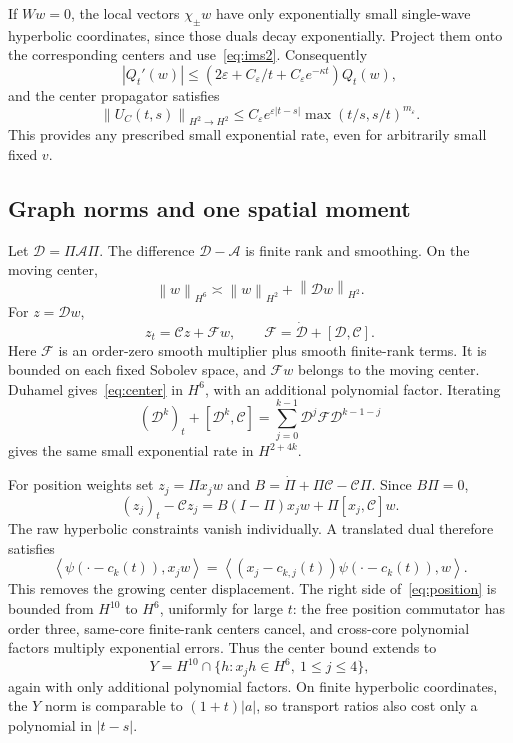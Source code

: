 \documentclass[11pt,a4paper]{article}
\theoremstyle{remark}\newtheorem{remark}[theorem]{Remark}
\newcommand{\norm}[1]{\left\|#1\right\|}
\newcommand{\ip}[2]{\left\langle #1,#2\right\rangle}
\begin{document}
If $Ww=0$, the local vectors $\chi_\pm w$ have only exponentially small single-wave hyperbolic coordinates, since those duals decay exponentially. Project them onto the corresponding centers and use~\eqref{eq:ims2}. Consequently
\[
 |Q_t'(w)|\le(2\varepsilon+C_\varepsilon/t+C_\varepsilon e^{-\kappa t})Q_t(w),
\]
and the center propagator satisfies
\begin{equation}\label{eq:center}
 \norm{U_C(t,s)}_{H^2\to H^2}
 \le C_\varepsilon e^{\varepsilon|t-s|}
       \max(t/s,s/t)^{m_\varepsilon}.
\end{equation}
This provides any prescribed small exponential rate, even for arbitrarily small fixed $v$.

\subsection{Graph norms and one spatial moment}
Let $\mathcal D=\Pi\mathcal A\Pi$. The difference $\mathcal D-\mathcal A$ is finite rank and smoothing. On the moving center,
\[
 \norm w_{H^6}\asymp\norm w_{H^2}+\norm{\mathcal Dw}_{H^2}.
\]
For $z=\mathcal Dw$,
\[
 z_t=\mathcal Cz+\mathcal Fw,\qquad
 \mathcal F=\dot{\mathcal D}+[\mathcal D,\mathcal C].
\]
Here $\mathcal F$ is an order-zero smooth multiplier plus smooth finite-rank terms. It is bounded on each fixed Sobolev space, and $\mathcal Fw$ belongs to the moving center. Duhamel gives~\eqref{eq:center} in $H^6$, with an additional polynomial factor. Iterating
\[
 (\mathcal D^k)_t+[\mathcal D^k,\mathcal C]
 =\sum_{j=0}^{k-1}\mathcal D^j\mathcal F\mathcal D^{k-1-j}
\]
gives the same small exponential rate in $H^{2+4k}$.

For position weights set $z_j=\Pi x_jw$ and
$B=\dot\Pi+\Pi\mathcal C-\mathcal C\Pi$. Since $B\Pi=0$,
\begin{equation}\label{eq:position}
 (z_j)_t-\mathcal Cz_j=B(I-\Pi)x_jw+\Pi[x_j,\mathcal C]w.
\end{equation}
The raw hyperbolic constraints vanish individually. A translated dual therefore satisfies
\[
 \ip{\psi(\cdot-c_k(t))}{x_jw}
 =\ip{(x_j-c_{k,j}(t))\psi(\cdot-c_k(t))}{w}.
\]
This removes the growing center displacement. The right side of~\eqref{eq:position} is bounded from $H^{10}$ to $H^6$, uniformly for large $t$: the free position commutator has order three, same-core finite-rank centers cancel, and cross-core polynomial factors multiply exponential errors. Thus the center bound extends to
\[
 Y=H^{10}\cap\{h:x_jh\in H^6,\ 1\le j\le4\},
\]
again with only additional polynomial factors. On finite hyperbolic coordinates, the $Y$ norm is comparable to $(1+t)|a|$, so transport ratios also cost only a polynomial in $|t-s|$.
\end{document}
